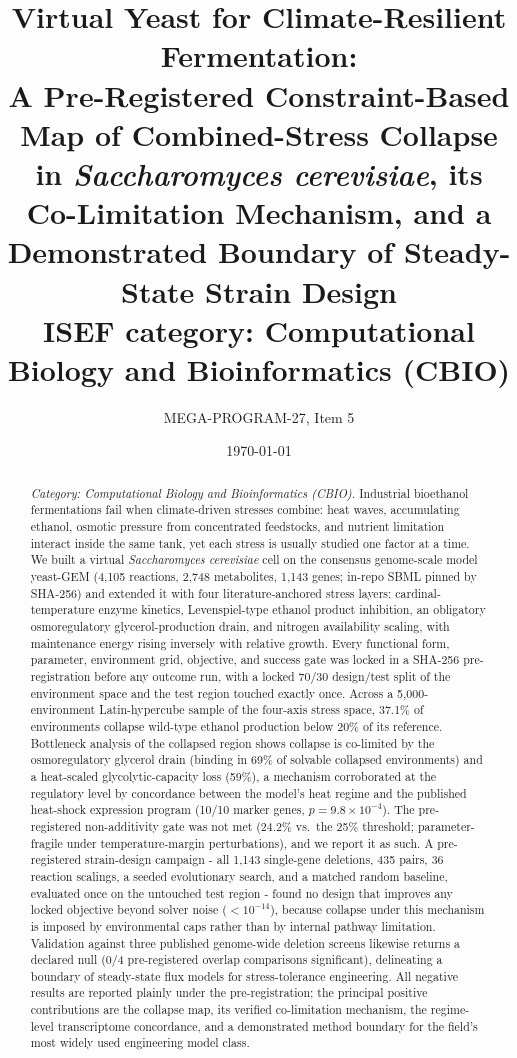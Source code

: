 \documentclass[12pt]{article}
\title{Virtual Yeast for Climate-Resilient Fermentation:\\[4pt]
{\large A Pre-Registered Constraint-Based Map of Combined-Stress Collapse
in \emph{Saccharomyces cerevisiae}, its Co-Limitation Mechanism, and a
Demonstrated Boundary of Steady-State Strain Design}\\[8pt]
{\normalsize ISEF category: Computational Biology and Bioinformatics (CBIO)}}
\author{MEGA-PROGRAM-27, Item 5}
\date{\today}
\begin{document}
\maketitle

\begin{abstract}
\noindent\emph{Category: Computational Biology and
Bioinformatics (CBIO).} Industrial bioethanol fermentations fail when
climate-driven stresses combine: heat waves, accumulating ethanol, osmotic pressure from
concentrated feedstocks, and nutrient limitation interact inside the same
tank, yet each stress is usually studied one factor at a time. We built a
virtual \emph{Saccharomyces cerevisiae} cell on the consensus genome-scale
model yeast-GEM (4{,}105 reactions, 2{,}748 metabolites, 1{,}143 genes;
in-repo SBML pinned by SHA-256) and extended it with four
literature-anchored stress layers: cardinal-temperature enzyme kinetics,
Levenspiel-type ethanol product inhibition, an obligatory osmoregulatory
glycerol-production drain, and nitrogen availability scaling, with
maintenance energy rising inversely with relative growth. Every functional
form, parameter, environment grid, objective, and success gate was locked
in a SHA-256 pre-registration before any outcome run, with a locked
70/30 design/test split of the environment space and the test region
touched exactly once. Across a 5{,}000-environment Latin-hypercube sample
of the four-axis stress space, 37.1\% of environments collapse wild-type
ethanol production below 20\% of its reference. Bottleneck analysis of the
collapsed region shows collapse is co-limited by the osmoregulatory
glycerol drain (binding in 69\% of solvable collapsed environments) and a
heat-scaled glycolytic-capacity loss (59\%), a mechanism corroborated at
the regulatory level by concordance between the model's heat regime and
the published heat-shock expression program (10/10 marker genes,
$p=9.8\times10^{-4}$). The pre-registered non-additivity gate was not met
(24.2\% vs.\ the 25\% threshold; parameter-fragile under temperature-margin
perturbations), and we report it as such. A pre-registered strain-design
campaign - all 1{,}143 single-gene deletions, 435 pairs, 36 reaction
scalings, a seeded evolutionary search, and a matched random baseline,
evaluated once on the untouched test region - found no design that
improves any locked objective beyond solver noise ($<10^{-14}$), because
collapse under this mechanism is imposed by environmental caps rather than
by internal pathway limitation. Validation against three published
genome-wide deletion screens likewise returns a declared null (0/4
pre-registered overlap comparisons significant), delineating a boundary of
steady-state flux models for stress-tolerance engineering. All negative
results are reported plainly under the pre-registration; the principal
positive contributions are the collapse map, its verified co-limitation
mechanism, the regime-level transcriptome concordance, and a demonstrated
method boundary for the field's most widely used engineering model class.
\end{abstract}
\end{document}
